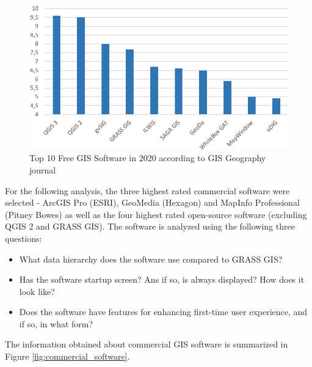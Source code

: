 \documentclass[a4paper,10pt,twoside]{article}
\begin{document}
\begin{figure}[hbt!] 
\begin{center}
\includegraphics[width=13cm]{../pictures/hodnoceni_free.png} 
\caption[Top 10 Free GIS Software in 2020 according to GISGeography journal]{Top 10 Free GIS Software in 2020 according to GIS Geography journal \cite{gisgeography}}
\label{fig:hodnoceni_free}
\end{center}
\end{figure}

\noindent For the following analysis, the three highest rated commercial software were selected - ArcGIS Pro (ESRI), GeoMedia (Hexagon) and MapInfo Professional (Pitney Bowes) as well as the four highest rated open-source software (excluding QGIS 2 and GRASS GIS). The software is analyzed using the following three questions:

\begin{itemize}
\item What data hierarchy does the software use compared to GRASS GIS?
\item Has the software startup screen? Ans if so, is always displayed? How does it look like? 
\item Does the software have features for enhancing first-time user experience, and if so, in what form?
\end{itemize}

\noindent The information obtained about commercial GIS software is summarized in Figure \ref{fig:commercial_software}.
\end{document}
